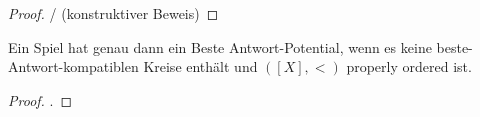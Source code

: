 \begin{proof}
	\cite{MonShap}/\cite{CongGamesPlayerSpecPayoff} (konstruktiver Beweis)
\end{proof}

\begin{satz}
	Ein Spiel hat genau dann ein Beste Antwort-Potential, wenn es keine beste-Antwort-kompatiblen Kreise enthält und $([X], <)$ properly ordered ist.
\end{satz}

\begin{proof}.
	
\end{proof}